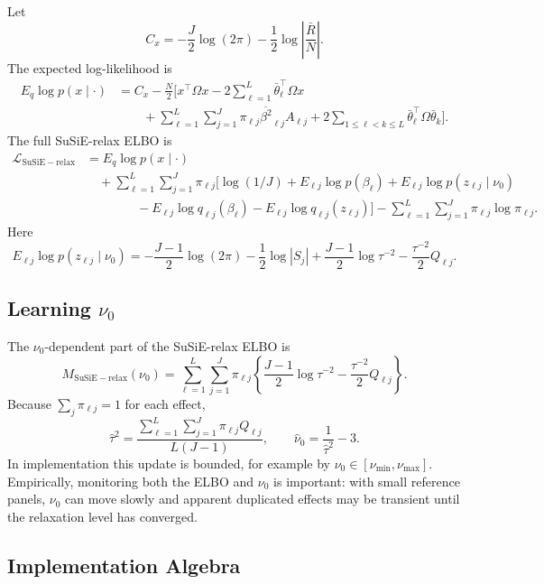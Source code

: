 \documentclass[11pt]{article}
\newcommand{\Rbar}{\bar R}
\newcommand{\Om}{\Omega}
\begin{document}
Let
\[
C_x=
-\frac{J}{2}\log(2\pi)
-\frac12\log\left|\frac{\Rbar}{N}\right|.
\]
The expected log-likelihood is
\begin{align}
E_q\log p(x\mid\cdot)
&=
C_x
-\frac{N}{2}
\Bigg[
x^\top\Om x
-2\sum_{\ell=1}^L\bar\theta_\ell^\top\Om x \nonumber\\
&\qquad
+\sum_{\ell=1}^L\sum_{j=1}^J
\pi_{\ell j}\overline{\beta^2}_{\ell j}A_{\ell j}
+2\sum_{1\le \ell<k\le L}
\bar\theta_\ell^\top\Om\bar\theta_k
\Bigg].
\end{align}
The full SuSiE-relax ELBO is
\begin{align}
\mathcal L_{\mathrm{SuSiE-relax}}
&=
E_q\log p(x\mid\cdot) \nonumber\\
&\quad
+\sum_{\ell=1}^L\sum_{j=1}^J
\pi_{\ell j}
\Big[
\log(1/J)
+E_{\ell j}\log p(\beta_\ell)
+E_{\ell j}\log p(z_{\ell j}\mid\nu_0) \nonumber\\
&\qquad\qquad
-E_{\ell j}\log q_{\ell j}(\beta_\ell)
-E_{\ell j}\log q_{\ell j}(z_{\ell j})
\Big]
-\sum_{\ell=1}^L\sum_{j=1}^J
\pi_{\ell j}\log\pi_{\ell j}.
\end{align}
Here
\[
E_{\ell j}\log p(z_{\ell j}\mid\nu_0)
=
-\frac{J-1}{2}\log(2\pi)
-\frac12\log|S_j|
+\frac{J-1}{2}\log\tau^{-2}
-\frac{\tau^{-2}}{2}Q_{\ell j}.
\]

\subsection{\texorpdfstring{Learning \(\nu_0\)}{Learning nu0}}

The \(\nu_0\)-dependent part of the SuSiE-relax ELBO is
\[
M_{\mathrm{SuSiE-relax}}(\nu_0)
=
\sum_{\ell=1}^L\sum_{j=1}^J
\pi_{\ell j}
\left\{
\frac{J-1}{2}\log\tau^{-2}
-\frac{\tau^{-2}}{2}Q_{\ell j}
\right\}.
\]
Because \(\sum_j\pi_{\ell j}=1\) for each effect,
\[
\hat\tau^2
=
\frac{
\sum_{\ell=1}^L\sum_{j=1}^J\pi_{\ell j}Q_{\ell j}
}{L(J-1)},
\qquad
\hat\nu_0=\frac{1}{\hat\tau^2}-3.
\]
In implementation this update is bounded, for example by
\(\nu_0\in[\nu_{\min},\nu_{\max}]\). Empirically, monitoring both the
ELBO and \(\nu_0\) is important: with small reference panels, \(\nu_0\)
can move slowly and apparent duplicated effects may be transient until
the relaxation level has converged.

\subsection{Implementation Algebra}
\end{document}
